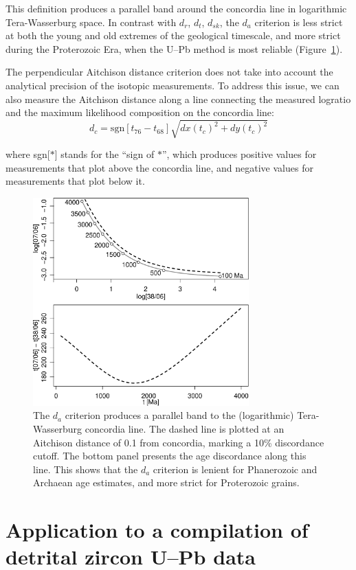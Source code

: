 \documentclass[gchron, manuscript]{copernicus}
\begin{document}
This definition produces a parallel band around the concordia line in
logarithmic Tera-Wasserburg space. In contrast with $d_r$, $d_t$,
$d_{sk}$, the $d_a$ criterion is less strict at both the young and old
extremes of the geological timescale, and more strict during the
Proterozoic Era, when the U--Pb method is most reliable
(Figure~\ref{fig:dperp}).

The perpendicular Aitchison distance criterion does not take into
account the analytical precision of the isotopic measurements.  To
address this issue, we can also measure the Aitchison distance along a
line connecting the measured logratio and the maximum likelihood
composition on the concordia line:
\begin{equation}
  d_c = \mbox{sgn}[t_{76}-t_{68}] \sqrt{ dx(t_c)^2 + dy(t_c)^2 }
  \label{eq:da}
\end{equation}

\noindent where sgn[$\ast$] stands for the ``sign of $\ast$'', which
produces positive values for measurements that plot above the
concordia line, and negative values for measurements that plot below
it.

\begin{figure}
  \includegraphics[width=8.3cm]{TW-option-4.pdf}
  \caption{The $d_a$ criterion produces a parallel band to the
    (logarithmic) Tera-Wasserburg concordia line. The dashed line is
    plotted at an Aitchison distance of 0.1 from concordia, marking
    a 10\% discordance cutoff. The bottom panel presents the age
    discordance along this line. This shows that the $d_a$ criterion
    is lenient for Phanerozoic and Archaean age estimates, and more
    strict for Proterozoic grains.
  }
  \label{fig:dperp}
\end{figure}

\section{Application to a compilation of detrital zircon U--Pb data}
\label{sec:application}
\end{document}
